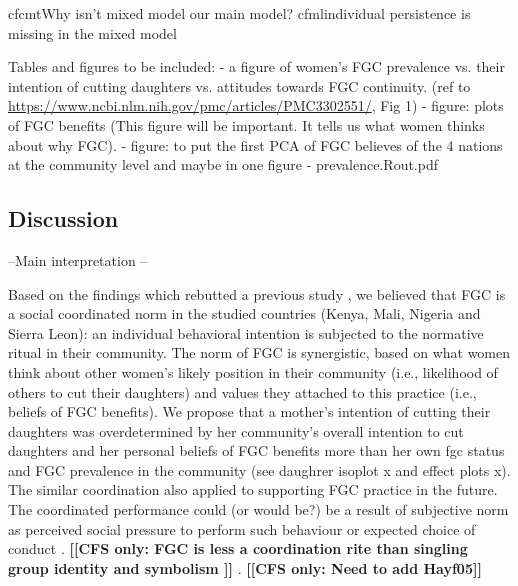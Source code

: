 \documentclass[12pt,]{article}
\newcommand{\comment}[1]{\textbf{[[#1]]}}
\newcommand{\cfonly}[1]{\comment{CFS only: #1}}
\begin{document}
cfcmt{Why isn’t mixed model our main model?}
cfml{individual persistence is missing in the mixed model}

Tables and figures to be included:
- a figure of women’s FGC prevalence vs. their intention of cutting daughters vs. attitudes towards FGC continuity.  (ref to \url{https://www.ncbi.nlm.nih.gov/pmc/articles/PMC3302551/}, Fig 1)
- figure:  plots of FGC benefits (This figure will be important. It tells us what women thinks about why FGC).
- figure: to put the first PCA of FGC believes of the 4 nations at the community level and maybe in one figure
- prevalence.Rout.pdf


\subsection{Discussion}\label{Discussion}

--Main interpretation --

Based on the findings which rebutted a previous study \cite{EffeVogt15}, we believed that FGC is a social coordinated norm \cite{Makie etc} in the studied countries (Kenya, Mali, Nigeria and Sierra Leon):  an individual behavioral intention is subjected to the normative ritual in their community.  The norm of FGC is synergistic, based on what women think about other women’s likely position in their community (i.e., likelihood of others to cut their daughters) and values they attached to this practice (i.e., beliefs of FGC benefits).  We propose that a mother’s intention of cutting their daughters was overdetermined by her community’s overall intention to cut daughters and her personal beliefs of FGC benefits more than her own fgc status and FGC prevalence in the community (see daughrer isoplot x and effect plots x).  The similar coordination also applied to supporting FGC practice in the future.  The coordinated performance could (or would be?) be a result of subjective norm as perceived social pressure to perform such behaviour or expected choice of conduct \cite{Ajze91}. \cfonly{FGC is less a coordination rite than singling group identity and symbolism \cite{ShelWand11, Youn15}} .  \cfonly{Need to add Hayf05}
\end{document}
